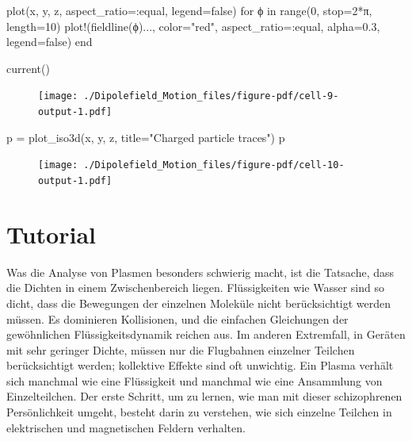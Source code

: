 \documentclass[
  a4paper,
  DIV=11]{scrreprt}
\newenvironment{Shaded}{\begin{snugshade}}{\end{snugshade}}
\newcommand{\ConstantTok}[1]{\textcolor[rgb]{0.56,0.35,0.01}{#1}}
\newcommand{\ControlFlowTok}[1]{\textcolor[rgb]{0.00,0.23,0.31}{#1}}
\newcommand{\FloatTok}[1]{\textcolor[rgb]{0.68,0.00,0.00}{#1}}
\newcommand{\FunctionTok}[1]{\textcolor[rgb]{0.28,0.35,0.67}{#1}}
\newcommand{\KeywordTok}[1]{\textcolor[rgb]{0.00,0.23,0.31}{#1}}
\newcommand{\NormalTok}[1]{\textcolor[rgb]{0.00,0.23,0.31}{#1}}
\newcommand{\OperatorTok}[1]{\textcolor[rgb]{0.37,0.37,0.37}{#1}}
\newcommand{\StringTok}[1]{\textcolor[rgb]{0.13,0.47,0.30}{#1}}
\begin{document}
\begin{Shaded}
\begin{Highlighting}[]
\FunctionTok{plot}\NormalTok{(x, y, z, aspect\_ratio}\OperatorTok{=:}\NormalTok{equal, legend}\OperatorTok{=}\ConstantTok{false}\NormalTok{)}
\ControlFlowTok{for}\NormalTok{ ϕ }\KeywordTok{in} \FunctionTok{range}\NormalTok{(}\FloatTok{0}\NormalTok{, stop}\OperatorTok{=}\FloatTok{2}\OperatorTok{*}\ConstantTok{π}\NormalTok{, length}\OperatorTok{=}\FloatTok{10}\NormalTok{)}
   \FunctionTok{plot!}\NormalTok{(}\FunctionTok{fieldline}\NormalTok{(ϕ)}\OperatorTok{...}\NormalTok{, color}\OperatorTok{=}\StringTok{"red"}\NormalTok{, aspect\_ratio}\OperatorTok{=:}\NormalTok{equal, alpha}\OperatorTok{=}\FloatTok{0.3}\NormalTok{, legend}\OperatorTok{=}\ConstantTok{false}\NormalTok{)}
\ControlFlowTok{end}

\FunctionTok{current}\NormalTok{()}
\end{Highlighting}
\end{Shaded}

\begin{figure}[H]

{\centering \texttt{[image: ./Dipolefield\_Motion\_files/figure-pdf/cell-9-output-1.pdf]}

}

\end{figure}

\begin{Shaded}
\begin{Highlighting}[]
\NormalTok{p }\OperatorTok{=} \FunctionTok{plot\_iso3d}\NormalTok{(x, y, z, title}\OperatorTok{=}\StringTok{"Charged particle traces"}\NormalTok{)}
\NormalTok{p}
\end{Highlighting}
\end{Shaded}

\begin{figure}[H]

{\centering \texttt{[image: ./Dipolefield\_Motion\_files/figure-pdf/cell-10-output-1.pdf]}

}

\end{figure}

\hypertarget{tutorial}{%
\chapter{Tutorial}\label{tutorial}}

Was die Analyse von Plasmen besonders schwierig macht, ist die Tatsache,
dass die Dichten in einem Zwischenbereich liegen. Flüssigkeiten wie
Wasser sind so dicht, dass die Bewegungen der einzelnen Moleküle nicht
berücksichtigt werden müssen. Es dominieren Kollisionen, und die
einfachen Gleichungen der gewöhnlichen Flüssigkeitsdynamik reichen aus.
Im anderen Extremfall, in Geräten mit sehr geringer Dichte, müssen nur
die Flugbahnen einzelner Teilchen berücksichtigt werden; kollektive
Effekte sind oft unwichtig. Ein Plasma verhält sich manchmal wie eine
Flüssigkeit und manchmal wie eine Ansammlung von Einzelteilchen. Der
erste Schritt, um zu lernen, wie man mit dieser schizophrenen
Persönlichkeit umgeht, besteht darin zu verstehen, wie sich einzelne
Teilchen in elektrischen und magnetischen Feldern verhalten.
\end{document}
